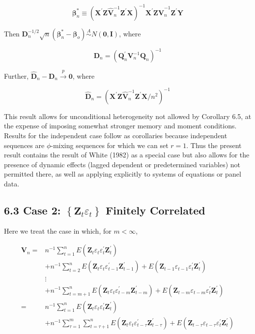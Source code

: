 \documentclass[10pt]{article}
\begin{document}
$$
\boldsymbol{\beta}_{n}^{*} \equiv\left(\mathbf{X}^{\prime} \mathbf{Z} \hat{\mathbf{V}}_{n}^{-1} \mathbf{Z}^{\prime} \mathbf{X}\right)^{-1} \mathbf{X}^{\prime} \mathbf{Z} \hat{\mathbf{V}}_{n}^{-1} \mathbf{Z}^{\prime} \mathbf{Y}
$$

Then $\mathbf{D}_{n}^{-1 / 2} \sqrt{n}\left(\boldsymbol{\beta}_{n}^{*}-\boldsymbol{\beta}_{o}\right) \stackrel{A}{\sim} N(\mathbf{0}, \mathbf{I})$, where

$$
\mathbf{D}_{n}=\left(\mathbf{Q}_{n}^{\prime} \mathbf{V}_{n}^{-1} \mathbf{Q}_{n}\right)^{-1}
$$

Further, $\hat{\mathbf{D}}_{n}-\mathbf{D}_{n} \xrightarrow{p} \mathbf{0}$, where

$$
\hat{\mathbf{D}}_{n}=\left(\mathbf{X}^{\prime} \mathbf{Z} \hat{\mathbf{V}}_{n}^{-1} \mathbf{Z}^{\prime} \mathbf{X} / n^{2}\right)^{-1}
$$

This result allows for unconditional heterogeneity not allowed by Corollary 6.5, at the expense of imposing somewhat stronger memory and moment conditions. Results for the independent case follow as corollaries because independent sequences are $\phi$-mixing sequences for which we can set $r=1$. Thus the present result contains the result of White (1982) as a special case but also allows for the presence of dynamic effects (lagged dependent or predetermined variables) not permitted there, as well as applying explicitly to systems of equations or panel data.

\subsection*{6.3 Case 2: $\left\{\mathbf{Z}_{t} \varepsilon_{t}\right\}$ Finitely Correlated}
Here we treat the case in which, for $m<\infty$,

$$
\begin{aligned}
\mathbf{V}_{n}= & n^{-1} \sum_{t=1}^{n} E\left(\mathbf{Z}_{t} \varepsilon_{t} \varepsilon_{t}^{\prime} \mathbf{Z}_{t}^{\prime}\right) \\
& +n^{-1} \sum_{t=2}^{n} E\left(\mathbf{Z}_{t} \varepsilon_{t} \varepsilon_{t-1}^{\prime} \mathbf{Z}_{t-1}^{\prime}\right)+E\left(\mathbf{Z}_{t-1} \varepsilon_{t-1} \varepsilon_{t}^{\prime} \mathbf{Z}_{t}^{\prime}\right) \\
& \vdots \\
& +n^{-1} \sum_{t=m+1}^{n} E\left(\mathbf{Z}_{t} \varepsilon_{t} \varepsilon_{t-m}^{\prime} \mathbf{Z}_{t-m}^{\prime}\right)+E\left(\mathbf{Z}_{t-m} \varepsilon_{t-m} \varepsilon_{t}^{\prime} \mathbf{Z}_{t}^{\prime}\right) \\
= & n^{-1} \sum_{t=1}^{n} E\left(\mathbf{Z}_{t} \varepsilon_{t} \varepsilon_{t}^{\prime} \mathbf{Z}_{t}^{\prime}\right) \\
& +n^{-1} \sum_{\tau=1}^{m} \sum_{t=\tau+1}^{n} E\left(\mathbf{Z}_{t} \varepsilon_{t} \varepsilon_{t-\tau}^{\prime} \mathbf{Z}_{t-\tau}^{\prime}\right)+E\left(\mathbf{Z}_{t-\tau} \varepsilon_{t-\tau} \varepsilon_{t}^{\prime} \mathbf{Z}_{t}^{\prime}\right)
\end{aligned}
$$
\end{document}
